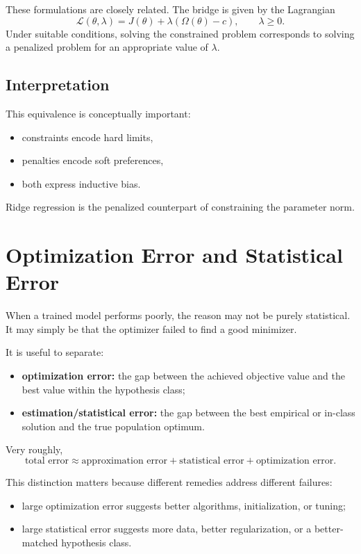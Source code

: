 These formulations are closely related. The bridge is given by the Lagrangian
\[
\mathcal{L}(\theta,\lambda)=J(\theta)+\lambda(\Omega(\theta)-c),
\qquad \lambda\ge 0.
\]
Under suitable conditions, solving the constrained problem corresponds to solving a penalized problem for an appropriate value of $\lambda$.

\subsection{Interpretation}

This equivalence is conceptually important:
\begin{itemize}
    \item constraints encode hard limits,
    \item penalties encode soft preferences,
    \item both express inductive bias.
\end{itemize}

Ridge regression is the penalized counterpart of constraining the parameter norm.

\section{Optimization Error and Statistical Error}

When a trained model performs poorly, the reason may not be purely statistical. It may simply be that the optimizer failed to find a good minimizer.

It is useful to separate:
\begin{itemize}
    \item \textbf{optimization error:} the gap between the achieved objective value and the best value within the hypothesis class;
    \item \textbf{estimation/statistical error:} the gap between the best empirical or in-class solution and the true population optimum.
\end{itemize}

Very roughly,
\[
\text{total error}
\approx
\text{approximation error}
+
\text{statistical error}
+
\text{optimization error}.
\]

This distinction matters because different remedies address different failures:
\begin{itemize}
    \item large optimization error suggests better algorithms, initialization, or tuning;
    \item large statistical error suggests more data, better regularization, or a better-matched hypothesis class.
\end{itemize}

